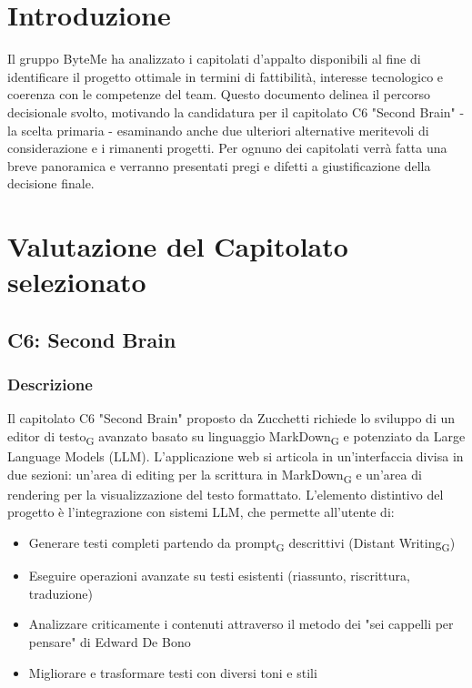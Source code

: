 \documentclass[11pt,a4paper]{article}
\newcommand{\gls}[1]{#1\textsubscript{G}}
\begin{document}
\newpage

\tableofcontents
\thispagestyle{empty}
\newpage

\setcounter{page}{1}

\section{Introduzione}
Il gruppo ByteMe ha analizzato i capitolati d'appalto disponibili al fine di identificare il progetto ottimale in termini di fattibilità, interesse tecnologico e coerenza con le competenze del team. Questo documento delinea il percorso decisionale svolto, motivando la candidatura per il capitolato C6 "Second Brain" - la scelta primaria - esaminando anche due ulteriori alternative meritevoli di considerazione e i rimanenti progetti. Per ognuno dei capitolati verrà fatta una breve panoramica e verranno presentati pregi e difetti a giustificazione della decisione finale.

\newpage
\section{Valutazione del Capitolato selezionato}

\subsection{C6: Second Brain}

\subsubsection{Descrizione}
Il capitolato C6 "Second Brain" proposto da Zucchetti richiede lo sviluppo di un \gls{editor di testo} avanzato basato su linguaggio \gls{MarkDown} e potenziato da Large Language Models (LLM). L'applicazione web si articola in un'interfaccia divisa in due sezioni: un'area di editing per la scrittura in \gls{MarkDown} e un'area di rendering per la visualizzazione del testo formattato.
L'elemento distintivo del progetto è l'integrazione con sistemi LLM, che permette all'utente di:
\begin{itemize}
    \item Generare testi completi partendo da \gls{prompt} descrittivi (\gls{Distant Writing})
    \item Eseguire operazioni avanzate su testi esistenti (riassunto, riscrittura, traduzione)
    \item Analizzare criticamente i contenuti attraverso il metodo dei "sei cappelli per pensare" di Edward De Bono
    \item Migliorare e trasformare testi con diversi toni e stili
\end{itemize}
\end{document}
